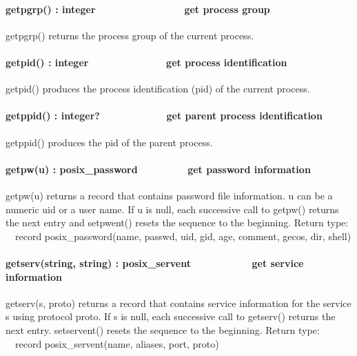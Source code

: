 \paragraph[getpgrp() : integer\ \ \ \ \ \ \ \ \ \ \ \ \ \  \ \ get
process group]{getpgrp() : integer\ \ \ \ \ \ \ \ \ \ \ \ \ \  \ \ get
process group}
getpgrp() returns the process group of the current process. 

\paragraph[getpid() : integer\ \ \ \ \ \ \ \ \ \ \ \  \ \ get process
identification]{getpid() : integer\ \ \ \ \ \ \ \ \ \ \ \  \ \ get
process identification}
getpid() produces the process identification (pid) of the current
process.

\paragraph[getppid() : integer?\ \ \ \ \ \ \ \ \ \  \ \ get parent
process identification]{getppid() : integer?\ \ \ \ \ \ \ \ \ \ 
\ \ get parent process identification}
getppid() produces the pid of the parent process.

\paragraph[getpw(u) : posix\_password\ \ \ \ \ \ \ \  \ get password
information]{getpw(u) : posix\_password\ \ \ \ \ \ \ \  \ get password
information}
getpw(u) returns a record that contains password file information. u can
be a numeric uid or a user name. If u is null, each successive call to
getpw() returns the next entry and setpwent() resets the sequence to
the beginning. Return type:\\
\ \ record posix\_password(name, passwd, uid, gid, age, comment, gecos,
dir, shell)

\paragraph[getserv(string, string) : posix\_servent\ \ \ \ \ \ 
\ \ \ \ \ get service information]{getserv(string, string) :
posix\_servent\ \ \ \ \ \  \ \ \ \ \ get service information}
getserv(s, proto) returns a record that contains service information for
the service s using protocol proto. If s is null, each successive call
to getserv() returns the next entry. setservent() resets the sequence
to the beginning. Return type:\\
\ \ record posix\_servent(name, aliases, port, proto) 

